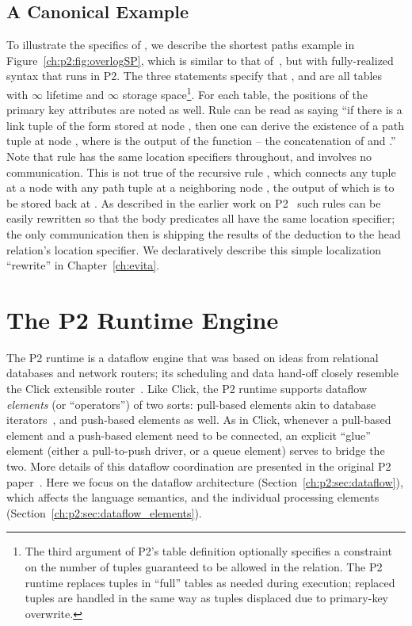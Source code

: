 \subsection{A Canonical Example}
\label{ch:p2:sec:declnet}

To illustrate the specifics of \OVERLOG, we describe the shortest paths example
in Figure~\ref{ch:p2:fig:overlogSP}, which is similar to that
of~\cite{loo-sigmod06}, but with fully-realized \OVERLOG syntax that runs in
P2.  The three  statements specify that , 
and  are all tables with $\infty$ lifetime and $\infty$ storage
space\footnote{The third argument of P2's table definition optionally specifies
a constraint on the number of tuples guaranteed to be allowed in the relation.
The P2 runtime replaces tuples in ``full'' tables as needed during execution;
replaced tuples are handled in the same way as tuples displaced due to
primary-key overwrite.}.  For each table, the positions of the primary key
attributes are noted as well.  Rule  can be read as saying ``if there is
a link tuple of the form  stored at node , then one can
derive the existence of a path tuple  at node , where
 is the output of the function  -- the concatenation of
 and .'' Note that rule  has the same location specifiers
throughout, and involves no communication.  This is not true of the recursive
rule , which connects any  tuple at a node  with any path
tuple at a neighboring node , the output of which is to be stored back at
.  As described in the earlier work on
P2~\cite{loo-sigcomm05,loo-sigmod06} such rules can be easily rewritten so that
the body predicates all have the same location specifier; the only
communication then is shipping the results of the deduction to the head
relation's location specifier.  We declaratively describe this simple 
localization ``rewrite'' in Chapter~\ref{ch:evita}.

\section{The P2 Runtime Engine}
\label{ch:p2:sec:p2}

The P2 runtime is a dataflow engine that was based on ideas from relational
databases and network routers; its scheduling and data hand-off closely
resemble the Click extensible router~\cite{click-tocs}.  Like Click, the P2
runtime supports dataflow {\em elements} (or ``operators'') of two sorts:
pull-based elements akin to database iterators~\cite{graefe-survey}, and
push-based elements as well.  As in Click, whenever a pull-based element and a
push-based element need to be connected, an explicit ``glue'' element (either a
pull-to-push driver, or a queue element) serves to bridge the two.  More
details of this dataflow coordination are presented in the original P2
paper~\cite{p2:sosp}.  Here we focus on the dataflow architecture
(Section~\ref{ch:p2:sec:dataflow}), which affects the language semantics, and
the individual processing elements (Section~\ref{ch:p2:sec:dataflow_elements}).

